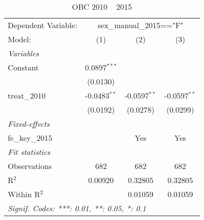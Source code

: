 
\begin{table}[htbp]
   \caption{OBC 2010 ~ 2015}
   \centering
   \begin{tabular}{lccc}
      \tabularnewline \midrule \midrule
      Dependent Variable: & \multicolumn{3}{c}{sex\_manual\_2015=="F"}\\
      Model:          & (1)            & (2)            & (3)\\  
      \midrule
      \emph{Variables}\\
      Constant        & 0.0897$^{***}$ &                &   \\   
                      & (0.0130)       &                &   \\   
      treat\_2010     & -0.0483$^{**}$ & -0.0597$^{**}$ & -0.0597$^{**}$\\   
                      & (0.0192)       & (0.0278)       & (0.0299)\\   
      \midrule
      \emph{Fixed-effects}\\
      fe\_key\_2015   &                & Yes            & Yes\\  
      \midrule
      \emph{Fit statistics}\\
      Observations    & 682            & 682            & 682\\  
      R$^2$           & 0.00920        & 0.32805        & 0.32805\\  
      Within R$^2$    &                & 0.01059        & 0.01059\\  
      \midrule \midrule
      \multicolumn{4}{l}{\emph{Signif. Codes: ***: 0.01, **: 0.05, *: 0.1}}\\
   \end{tabular}
\end{table}


